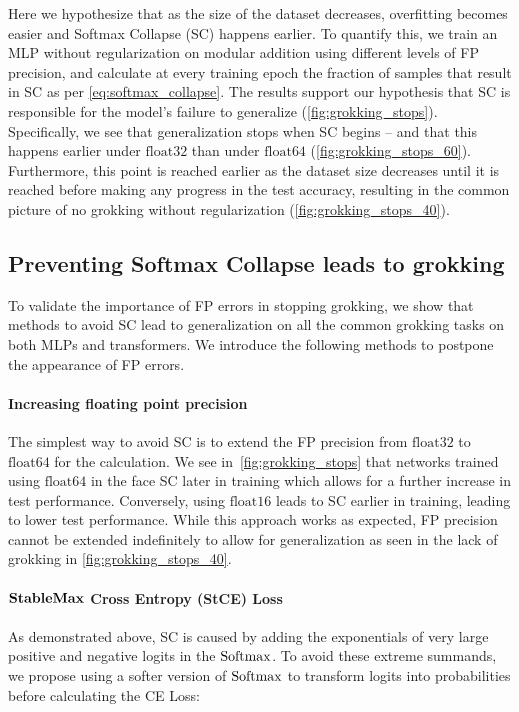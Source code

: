 Here we hypothesize that as the size of the dataset decreases, overfitting becomes easier and Softmax Collapse (SC) happens earlier. To quantify this, we train an MLP without regularization on modular addition using different levels of FP precision, and calculate at every training epoch the fraction of samples that result in SC as per \cref{eq:softmax_collapse}. 
The results support our hypothesis that SC is responsible for the model's failure to generalize (\cref{fig:grokking_stops}). Specifically, we see that generalization stops when SC begins -- and that this happens earlier under $\mathrm{float32}$ than under $\mathrm{float64}$ (\cref{fig:grokking_stops_60}). Furthermore, this point is reached earlier as the dataset size decreases until it is reached before making any progress in the test accuracy, resulting in the common picture of no grokking without regularization (\cref{fig:grokking_stops_40}).



\subsection{Preventing Softmax Collapse leads to grokking}
\label{sec:preventing_sc}

To validate the importance of FP errors in stopping grokking, we show that methods to avoid SC lead to generalization on all the common grokking tasks on both MLPs and transformers. We introduce the following methods to postpone the appearance of FP errors.

\paragraph{Increasing floating point precision}
The simplest way to avoid SC is to extend the FP precision from $\mathrm{float32}$ to $\mathrm{float64}$ for the \softmax calculation. We see in~\cref{fig:grokking_stops} that networks trained using $\mathrm{float64}$ in the \softmax face SC later in training which allows for a further increase in test performance. Conversely, using $\mathrm{float16}$ leads to SC earlier in training, leading to lower test performance.
While this approach works as expected, FP precision cannot be extended indefinitely to allow for generalization as seen in the lack of grokking in \cref{fig:grokking_stops_40}.


\paragraph{$\bm{\mathrm{StableMax}}$ Cross Entropy (StCE) Loss} As demonstrated above, SC is caused by adding the exponentials of very large positive and negative logits in the $\mathrm{Softmax}$. To avoid these extreme summands, we propose using a softer version of $\mathrm{Softmax}$ to transform logits into probabilities before calculating the CE Loss: %

